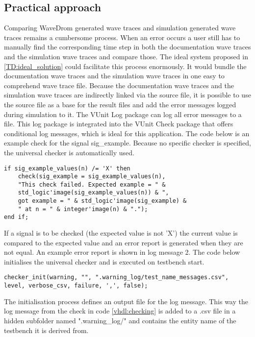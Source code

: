 \subsection{Practical approach}\label{TD:practical_approach}\label{log:error_message}
Comparing WaveDrom generated wave traces and simulation generated wave traces remains a cumbersome process. When an error occurs a user still has to manually find the corresponding time step in both the documentation wave traces and the simulation wave traces and compare those.
\npar
The ideal system proposed in \ref{TD:ideal_solution} could facilitate this process enormously. It would bundle the documentation wave traces and the simulation wave traces in one easy to comprehend wave trace file.
\npar
Because the documentation wave traces and the simulation wave traces are indirectly linked via the source file, it is possible to use the source file as a base for the result files and add the error messages logged during simulation to it. The VUnit Log package can log all error messages to a file. This log package is integrated into the VUnit Check package that offers conditional log messages, which is ideal for this application. The code below is an example check for the signal sig\_example. Because no specific checker is specified, the universal checker is automatically used.
\begin{lstlisting}[style=vhdl, caption={Signal checking in VHDL}, label={vhdl:checking}]
if sig_example_values(n) /= 'X' then
	check(sig_example = sig_example_values(n),  
	"This check failed. Expected example = " &
	std_logic'image(sig_example_values(n)) & ", 
	got example = " & std_logic'image(sig_example) & 
	" at n = " & integer'image(n) & ".");
end if;
\end{lstlisting}\noindent
If a signal is to be checked (the expected value is not 'X') the current value is compared to the expected value and an error report is generated when they are not equal. An example error report is shown in log message 2. The code below initialises the universal checker and is executed on testbench start.
\begin{lstlisting}[style=vhdl, caption={}, label={vhdl:checker_init}]
checker_init(warning, "", ".warning_log/test_name_messages.csv", level, verbose_csv, failure, ',', false);
\end{lstlisting}\noindent
The initialisation process defines an output file for the log message. This way the log message from the check in code \ref{vhdl:checking} is added to a .csv file in a hidden subfolder named ".warning\_log/" and contains the entity name of the testbench it is derived from.
